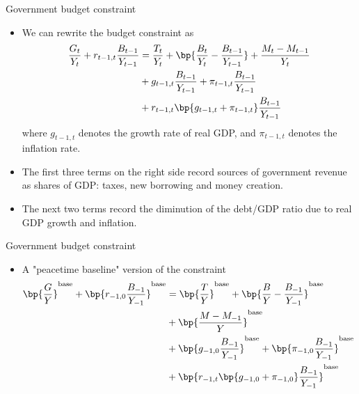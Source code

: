 \documentclass[11pt,xcolor={dvipsnames},hyperref={pdftex,pdfpagemode=UseNone,hidelinks,pdfdisplaydoctitle=true},usepdftitle=false]{beamer}
\begin{document}
    \begin{frame}{Government budget constraint}
    \begin{itemize}
    \item We can rewrite the budget constraint as 
    \begin{align*}
        \frac{G_t}{Y_t} + r_{t-1,t} \frac{B_{t-1}}{Y_{t-1}} &= \frac{T_t}{Y_t}  + \bp{\frac{B_t}{Y_t} -\frac{B_{t-1}}{Y_{t-1}} } + \frac{M_t - M_{t-1}}{Y_t} \\
        & + g_{t-1,t} \frac{B_{t-1}}{Y_{t-1}}  + \pi_{t-1,t} \frac{B_{t-1}}{Y_{t-1}} \\
        & +  r_{t-1,t}\bp{g_{t-1,t}+\pi_{t-1,t}} \frac{B_{t-1}}{Y_{t-1}} 
    \end{align*}
    where $g_{t-1,t}$ denotes the growth rate of real GDP, and $\pi_{t-1,t}$ denotes the inflation rate.
    \item The first three terms on the right
    side record sources of government revenue as shares of GDP: taxes, new borrowing and money
    creation. 
    \item The next two terms record the diminution of the debt/GDP ratio due to real GDP
    growth and inflation.
    \end{itemize}
    \end{frame}
    \begin{frame}{Government budget constraint}
        \begin{itemize}
        \item  A "peacetime baseline" version of the constraint
        \begin{align*}
            \bp{\frac{G}{Y}}^{\text{base}} + \bp{r_{-1,0} \frac{B_{-1}}{Y_{-1}}}^{\text{base}} &= \bp{\frac{T}{Y}}^{\text{base}}  + \bp{\frac{B}{Y} -\frac{B_{-1}}{Y_{-1}} }^{\text{base}} \\
            & + \bp{\frac{M - M_{-1}}{Y}}^{\text{base}} \\
            & + \bp{g_{-1,0} \frac{B_{-1}}{Y_{-1}}}^{\text{base}}  + \bp{\pi_{-1,0} \frac{B_{-1}}{Y_{-1}}}^{\text{base}} \\
            & +  \bp{r_{-1,t}\bp{g_{-1,0}+\pi_{-1,0}} \frac{B_{-1}}{Y_{-1}}}^{\text{base}} 
        \end{align*}
        
        \end{itemize}
        \end{frame}
\end{document}
